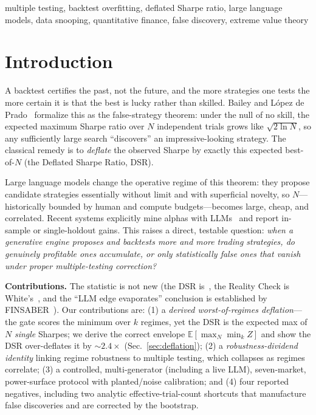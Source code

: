 \documentclass[conference]{IEEEtran}
\begin{document}
\begin{IEEEkeywords}
multiple testing, backtest overfitting, deflated Sharpe ratio, large language models,
data snooping, quantitative finance, false discovery, extreme value theory
\end{IEEEkeywords}

\section{Introduction}
A backtest certifies the past, not the future, and the more strategies one tests the more
certain it is that the best is lucky rather than skilled. Bailey and L\'opez de Prado~\cite{dsr}
formalize this as the false-strategy theorem: under the null of no skill, the expected maximum
Sharpe ratio over $N$ independent trials grows like $\sqrt{2\ln N}$, so any sufficiently large
search ``discovers'' an impressive-looking strategy. The classical remedy is to \emph{deflate}
the observed Sharpe by exactly this expected best-of-$N$ (the Deflated Sharpe Ratio, DSR).

Large language models change the operative regime of this theorem: they propose candidate
strategies essentially without limit and with superficial novelty, so $N$---historically
bounded by human and compute budgets---becomes large, cheap, and correlated. Recent systems
explicitly mine alphas with LLMs~\cite{alphaagent} and report in-sample or single-holdout
gains. This raises a direct, testable question:
\emph{when a generative engine proposes and backtests more and more trading strategies, do
genuinely profitable ones accumulate, or only statistically false ones that vanish under
proper multiple-testing correction?}

\textbf{Contributions.} The statistic is not new (the DSR is~\cite{dsr}, the Reality Check is
White's~\cite{rc}, and the ``LLM edge evaporates'' conclusion is established by
FINSABER~\cite{finsaber}). Our contributions are: (1) a \emph{derived worst-of-regimes
deflation}---the gate scores the minimum over $k$ regimes, yet the DSR is the expected max of
$N$ \emph{single} Sharpes; we derive the correct envelope $\mathbb{E}[\max_N \min_k Z]$ and
show the DSR over-deflates it by ${\sim}2.4\times$ (Sec.~\ref{sec:deflation}); (2) a
\emph{robustness-dividend identity} linking regime robustness to multiple testing, which
collapses as regimes correlate; (3) a controlled, multi-generator (including a live LLM),
seven-market, power-surface protocol with planted/noise calibration; and (4) four reported
negatives, including two analytic effective-trial-count shortcuts that manufacture false
discoveries and are corrected by the bootstrap.
\end{document}
